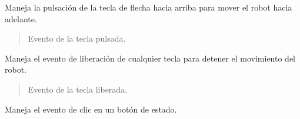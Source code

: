 \documentclass[a4paper,10pt,spanish]{sphinxmanual}
\begin{document}
\begin{fulllineitems}

\begin{fulllineitems}
\label{\detokenize{squad_state_manager:squad_state_manager.InterfazManager.on_arrow_up}}
\pysigstartsignatures
{}
\pysigstopsignatures
\sphinxAtStartPar
Maneja la pulsación de la tecla de flecha hacia arriba para mover el robot hacia adelante.
\begin{quote}\begin{description}
\sphinxAtStartPar
{} \textendash{} Evento de la tecla pulsada.

\end{description}\end{quote}

\end{fulllineitems}


\begin{fulllineitems}
\label{\detokenize{squad_state_manager:squad_state_manager.InterfazManager.on_key_release}}
\pysigstartsignatures
{}
\pysigstopsignatures
\sphinxAtStartPar
Maneja el evento de liberación de cualquier tecla para detener el movimiento del robot.
\begin{quote}\begin{description}
\sphinxAtStartPar
{} \textendash{} Evento de la tecla liberada.

\end{description}\end{quote}

\end{fulllineitems}


\begin{fulllineitems}
\label{\detokenize{squad_state_manager:squad_state_manager.InterfazManager.on_state_button_click}}
\pysigstartsignatures
{}
\pysigstopsignatures
\sphinxAtStartPar
Maneja el evento de clic en un botón de estado.


\end{fulllineitems}
\end{fulllineitems}
\end{document}
